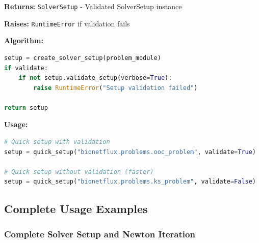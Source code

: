 \textbf{Returns:} \texttt{SolverSetup} - Validated SolverSetup instance

\textbf{Raises:} \texttt{RuntimeError} if validation fails

\textbf{Algorithm:}
\begin{lstlisting}[language=Python, caption=Quick Setup Implementation]
setup = create_solver_setup(problem_module)
if validate:
    if not setup.validate_setup(verbose=True):
        raise RuntimeError("Setup validation failed")

return setup
\end{lstlisting}

\textbf{Usage:}
\begin{lstlisting}[language=Python, caption=Quick Setup Usage]
# Quick setup with validation
setup = quick_setup("bionetflux.problems.ooc_problem", validate=True)

# Quick setup without validation (faster)
setup = quick_setup("bionetflux.problems.ks_problem", validate=False)
\end{lstlisting}

\subsection{Complete Usage Examples}
\label{subsec:complete_usage_examples_detailed}

\subsubsection{Complete Solver Setup and Newton Iteration}


